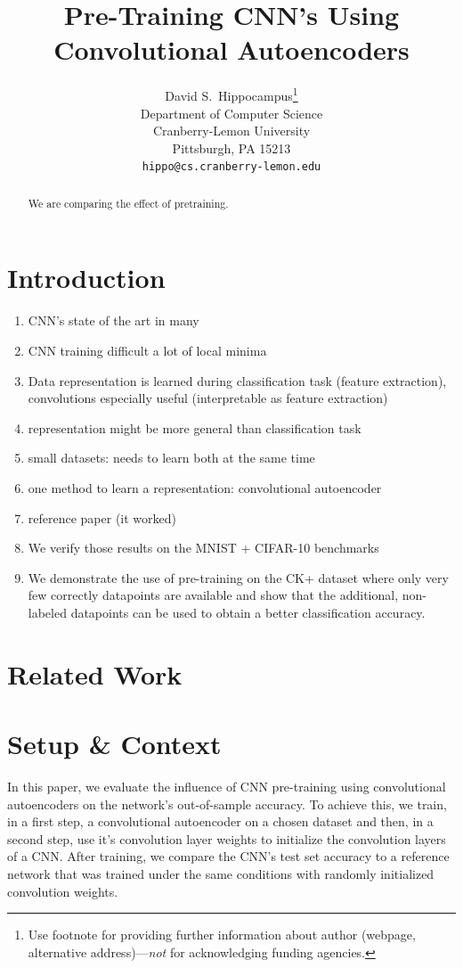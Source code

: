 \documentclass{article}
\title{Pre-Training CNN's Using Convolutional Autoencoders}
\author{
  David S.~Hippocampus\thanks{Use footnote for providing further
    information about author (webpage, alternative
    address)---\emph{not} for acknowledging funding agencies.} \\
  Department of Computer Science\\
  Cranberry-Lemon University\\
  Pittsburgh, PA 15213 \\
  \texttt{hippo@cs.cranberry-lemon.edu} \\
}
\begin{document}

\maketitle

\begin{abstract}
  We are comparing the effect of pretraining.
\end{abstract}

\section{Introduction}
  
  \begin{enumerate}
    \item CNN's state of the art in many
    \item CNN training difficult a lot of local minima
    \item Data representation is learned during classification task (feature extraction), convolutions especially useful (interpretable as feature extraction)
    \item representation might be more general than classification task
    \item small datasets: needs to learn both at the same time
    \item one method to learn a representation: convolutional autoencoder
    \item reference paper (it worked)
    \item We verify those results on the MNIST + CIFAR-10 benchmarks
    \item We demonstrate the use of pre-training on the CK+ dataset where only very few correctly datapoints are available and show that the additional, non-labeled datapoints can be used to obtain a better classification accuracy.
  \end{enumerate}
  

\section{Related Work}
\section{Setup \& Context}
  
  In this paper, we evaluate the influence of CNN pre-training using convolutional autoencoders on the network's out-of-sample accuracy. To achieve this, we train, in a first step, a convolutional autoencoder on a chosen dataset and then, in a second step, use it's convolution layer weights to initialize the convolution layers of a CNN. After training, we compare the CNN's test set accuracy to a reference network that was trained under the same conditions with randomly initialized convolution weights. 
\end{document}
